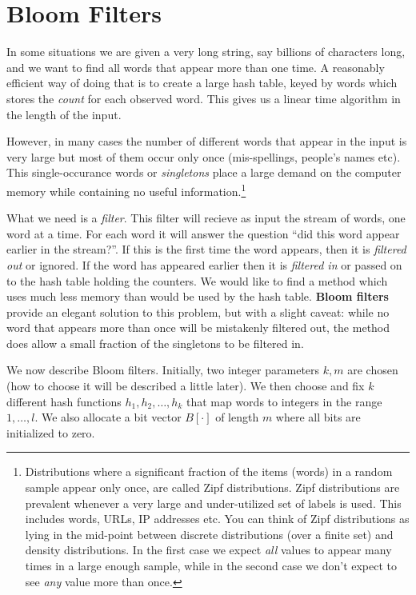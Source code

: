 \chapter{Bloom Filters}

In some situations we are given a very long string, say billions of
characters long, and we want to find all words that appear more than
one time. A reasonably efficient way of doing that is to create a large hash
table, keyed by words which stores the {\em count} for each
observed word.  This gives us a linear time algorithm in the length of
the input. 

However, in many cases the number of different words that appear in
the input is very large but most of them occur only once
(mis-spellings, people's names etc). This single-occurance words or
{\em singletons} place a large demand on the computer memory while
containing no useful information.\footnote{ Distributions where a
  significant fraction of the items (words) in a random sample appear
  only once, are called Zipf distributions.  Zipf distributions are
  prevalent whenever a very large and under-utilized set of labels is
  used. This includes words, URLs, IP addresses etc.  You can think of
  Zipf distributions as lying in the mid-point between discrete
  distributions (over a finite set) and density distributions. In the
  first case we expect {\em all} values to appear many times in a
  large enough sample, while in the second case we don't expect to see
  {\em any} value more than once.}

What we need is a {\em filter}. This filter will recieve as input the
stream of words, one word at a time. For each word it will answer the
question ``did this word appear earlier in the stream?''. If this is
the first time the word appears, then it is {\em filtered out} or
ignored. If the word has appeared earlier then it is {\em filtered in}
or passed on to the hash table holding the counters. We would like to
find a method which uses much less memory than would be used by the
hash table.  {\bf Bloom filters} provide an elegant solution to this
problem, but with a slight caveat: while no word that appears more
than once will be mistakenly filtered out, the method does allow a
small fraction of the singletons to be filtered in.

We now describe Bloom filters. Initially, two integer parameters $k,m$
are chosen (how to choose it will be described a little later). We
then choose and fix $k$ different hash functions $h_1,h_2,\ldots,h_k$
that map words to integers in the range $1,\ldots,l$. We also allocate
a bit vector $B[\cdot]$ of length $m$ where all bits are initialized to
zero.

